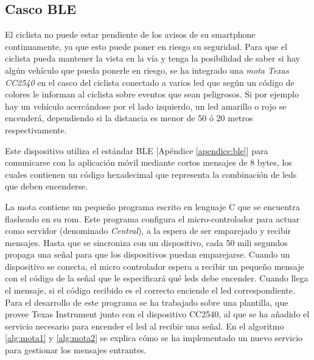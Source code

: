 \subsection{Casco BLE}\label{ssection:cascoBLE}
El ciclista no puede estar pendiente de los avisos de su smartphone continuamente, ya que esto puede poner en riesgo su seguridad. Para que el ciclista pueda mantener la vista en la vía y tenga la posibilidad de saber si hay algún vehículo que pueda ponerle en riesgo, se ha integrado una \emph{mota Texas CC2540} en el casco del ciclista conectado a varios led que según un código de colores le informan al ciclista sobre eventos que sean peligrosos. Si por ejemplo hay un vehículo acercándose por el lado izquierdo, un led amarillo o rojo se encenderá, dependiendo si la distancia es menor de 50 ó 20 metros respectivamente.

Este dispositivo utiliza el estándar BLE [Apéndice \ref{apendice:ble}] para comunicarse con la aplicación móvil mediante cortos mensajes de 8 bytes, los cuales contienen un código hexadecimal que representa la combinación de leds que deben encenderse.

La mota contiene un pequeño programa escrito en	lenguaje C que se encuentra flasheado en su \gls{rom}. Este programa configura el micro-controlador para actuar como servidor (denominado \emph{Central}), a la espera de ser emparejado y recibir mensajes. Hasta que se sincroniza con un dispositivo, cada 50 mili segundos propaga una señal para que los dispositivos	puedan emparejarse. Cuando un dispositivo se conecta, el micro controlador espera a recibir un pequeño mensaje con el código de la señal que le especificará qué	leds debe encender. Cuando llega el mensaje, si el código recibido es el correcto enciende el led correspondiente. Para el desarrollo de este programa se ha trabajado sobre una plantilla, que provee Texas Instrument junto con el dispositivo CC2540,	al que se ha añadido el servicio necesario para encender el led al recibir una señal. En el algoritmo \ref{alg:mota1} y \ref{alg:mota2} se explica cómo se ha implementado un nuevo servicio para gestionar los mensajes entrantes.

